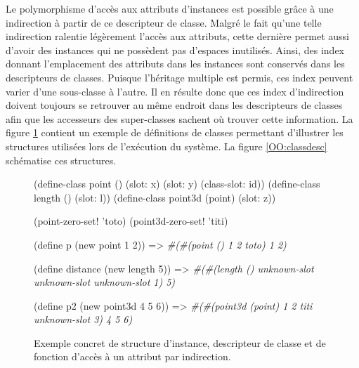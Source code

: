 \documentclass[12pt,twoside,letterpaper,francais]{book}
\newcommand{\schemeresult}[1]{{\it #1}}
\begin{document}
Le polymorphisme d'accès aux attributs d'instances est possible grâce
à une indirection à partir de ce descripteur de classe. Malgré le fait
qu'une telle indirection ralentie légèrement l'accès aux attributs,
cette dernière permet aussi d'avoir des instances qui ne possèdent pas
d'espaces inutilisés. Ainsi, des index donnant l'emplacement des
attributs dans les instances sont conservés dans les descripteurs de
classes. Puisque l'héritage multiple est permis, ces index peuvent
varier d'une sous-classe à l'autre. Il en résulte donc que ces index
d'indirection doivent toujours se retrouver au même endroit dans les
descripteurs de classes afin que les accesseurs des super-classes
sachent où trouver cette information. La figure \ref{OO:obj-struct}
contient un exemple de définitions de classes permettant d'illustrer
les structures utilisées lors de l'exécution du système. La figure
\ref{OO:classdesc} schématise ces structures.\\

\begin{figure}[htb!]
  \begin{schemecode}
(define-class point () (slot: x) (slot: y) (class-slot: id))
(define-class length () (slot: l))
(define-class point3d (point) (slot: z))

(point-zero-set! 'toto)
(point3d-zero-set! 'titi)

(define p (new point 1 2)) => \schemeresult{\#(\#(point () 1 2 toto) 1 2)}

(define distance (new length 5)) 
   => \schemeresult{\#(\#(length () unknown-slot unknown-slot unknown-slot 1) 5)}

(define p2 (new point3d 4 5 6))  
   => \schemeresult{\#(\#(point3d (point) 1 2 titi unknown-slot 3) 4 5 6)}
  \end{schemecode}
  \caption{Exemple concret de structure d'instance, descripteur de
    classe et de fonction d'accès à un attribut par indirection.}
  \label{OO:obj-struct}
\end{figure}
\end{document}
